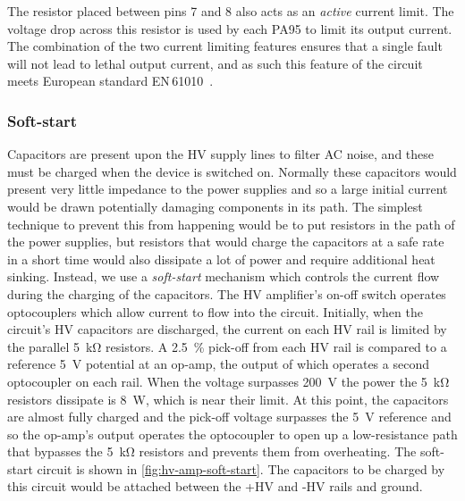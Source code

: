 The resistor placed between pins 7 and 8 also acts as an \emph{active} current limit. The voltage drop across this resistor is used by each PA95 to limit its output current. The combination of the two current limiting features ensures that a single fault will not lead to lethal output current, and as such this feature of the circuit meets European standard EN\,61010~\cite{EN2010}.

\subsubsection{Soft-start}
Capacitors are present upon the \gls{HV} supply lines to filter \gls{AC} noise, and these must be charged when the device is switched on. Normally these capacitors would present very little impedance to the power supplies and so a large initial current would be drawn potentially damaging components in its path. The simplest technique to prevent this from happening would be to put resistors in the path of the power supplies, but resistors that would charge the capacitors at a safe rate in a short time would also dissipate a lot of power and require additional heat sinking. Instead, we use a \emph{soft-start} mechanism which controls the current flow during the charging of the capacitors. The \gls{HV} amplifier's on-off switch operates optocouplers which allow current to flow into the circuit. Initially, when the circuit's \gls{HV} capacitors are discharged, the current on each \gls{HV} rail is limited by the parallel \SI{5}{\kilo\ohm} resistors. A \SI{2.5}{\percent} pick-off from each \gls{HV} rail is compared to a reference \SI{5}{\volt} potential at an op-amp, the output of which operates a second optocoupler on each rail. When the voltage surpasses \SI{200}{\volt} the power the \SI{5}{\kilo\ohm} resistors dissipate is \SI{8}{\watt}, which is near their limit. At this point, the capacitors are almost fully charged and the pick-off voltage surpasses the \SI{5}{\volt} reference and so the op-amp's output operates the optocoupler to open up a low-resistance path that bypasses the \SI{5}{\kilo\ohm} resistors and prevents them from overheating. The soft-start circuit is shown in \cref{fig:hv-amp-soft-start}. The capacitors to be charged by this circuit would be attached between the +HV and -HV rails and ground.

